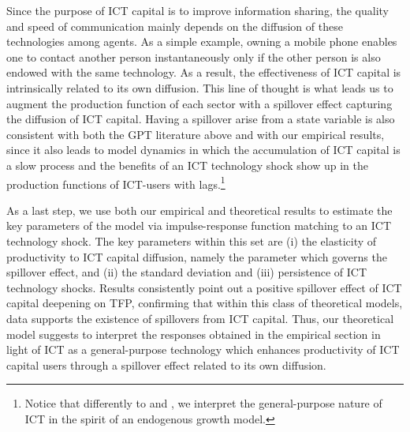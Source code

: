 \documentclass[12pt]{article}
\begin{document}
Since the purpose of ICT capital is to improve information sharing, the quality and speed of communication mainly depends on the diffusion of these technologies among agents. As a simple example, owning a mobile phone enables one to contact another person instantaneously only if the other person is also endowed with the same technology. As a result, the effectiveness of ICT capital is intrinsically related to its own diffusion. This line of thought is what leads us to augment the production function of each sector with a spillover effect capturing the diffusion of ICT capital.  Having a spillover arise from a state variable is also consistent with both the GPT literature above and with our empirical results, since it also leads to model dynamics in which the accumulation of ICT capital is a slow process and the benefits of an ICT technology shock show up in the production functions of ICT-users with lags.\footnote{Notice that differently to \cite{basu2003case} and \cite{basu2007information}, we interpret the general-purpose nature of ICT in the spirit of an endogenous growth model.}

As a last step, we use both our empirical and theoretical results to estimate the key parameters of the model via impulse-response function matching to an ICT technology shock. The key parameters within this set are (i) the elasticity of productivity to ICT capital diffusion, namely the parameter which governs the spillover effect, and (ii) the standard deviation and (iii) persistence of ICT technology shocks. Results consistently point out a positive spillover effect of ICT capital deepening on TFP, confirming that within this class of theoretical models, data supports the existence of spillovers from ICT capital. Thus, our theoretical model suggests to interpret the responses obtained in the empirical section in light of ICT as a general-purpose technology which enhances productivity of ICT capital users through a spillover effect related to its own diffusion.
\end{document}
